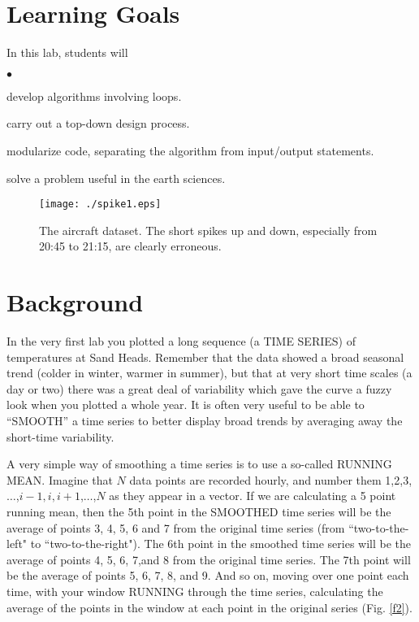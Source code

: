 \documentclass[letterpaper,11pt]{article}
\newcounter{lnum}
\newenvironment{abbrevlist}%
  {\begin{list}{$\bullet$}{\setlength{\leftmargin}{2em}%
               \setlength{\itemindent}{0em}%
               \setlength{\itemsep}{0pt}%
               \setlength{\parsep}{0pt}%
               \setlength{\topsep}{2pt}%
               \usecounter{lnum} } }{\end{list}}
\begin{document}

\section*{Learning Goals}
In this lab, students will
\begin{abbrevlist}
\item develop algorithms involving loops.
\item carry out a top-down design process.
\item modularize code, separating the algorithm from input/output statements.
\item solve a problem useful in the earth sciences.
\end{abbrevlist}


\begin{figure}[h]
\centering
\texttt{[image: ./spike1.eps]}
\caption{ The aircraft dataset. The short spikes up and down, especially from 20:45 to 21:15,  are clearly erroneous.}
\label{f1}
\end{figure}

\section*{Background}

In the very first lab you plotted a long sequence (a TIME SERIES) of 
temperatures at Sand Heads. 
Remember that the data showed a broad seasonal trend (colder in winter, warmer in summer), 
but that at very short time scales
(a day or two) there was a great deal of variability which gave the curve a fuzzy
look when you plotted a whole year. It is often very useful to be able to ``SMOOTH'' a time series to better display
broad trends by averaging away the short-time variability. 

A very simple way of
smoothing a time series is to use a so-called RUNNING MEAN. Imagine that $N$ data points are recorded hourly,
and number them 1,2,3,$\ldots$,$i-1,i,i+1$,$\ldots$,$N$ as they appear in a vector. 
If we are calculating a 5 point running
mean, then the 5th point in the SMOOTHED time series will be the average of points 3, 4, 5, 6 and 7 from
the original time series (from ``two-to-the-left" to ``two-to-the-right"). The 6th point in the smoothed time series will be the average of points
4, 5, 6, 7,and 8 from the original time series. The 7th point will be the average of points 5, 6, 7, 8, and 9.
And so on, moving over one point each time, with your window RUNNING through the time series, calculating the average of the points in 
the window at each point in the original series (Fig. \ref{f2}).
\end{document}
